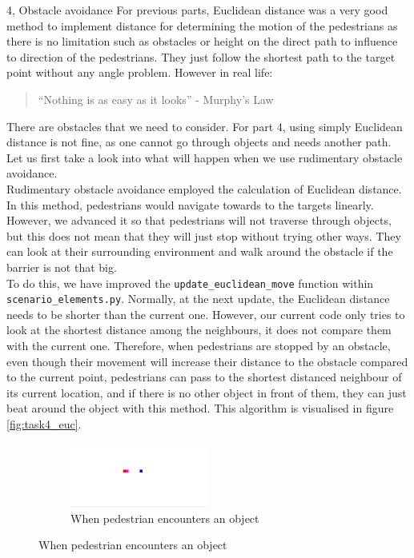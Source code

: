 \documentclass[10pt,a4paper]{article}
\begin{document}
\begin{task}{4, Obstacle avoidance}
For previous parts, Euclidean distance was a very good method to implement distance for determining the motion of the pedestrians as there is no limitation such as obstacles or height on the direct path to influence to direction of the pedestrians. They just follow the shortest path to the target point without any angle problem. However in real life: 


\begin{quote}
``Nothing is as easy as it looks'' - Murphy's Law
\end{quote}  

There are obstacles that we need to consider. For part 4, using simply Euclidean distance is not fine, as one cannot go through objects and needs another path. Let us first take a look into what will happen when we use rudimentary obstacle avoidance.\\

Rudimentary obstacle avoidance employed the calculation of Euclidean distance. In this method, pedestrians would navigate towards to the targets linearly. However, we advanced it so that pedestrians will not traverse through objects, but this does not mean that they will just stop without trying other ways. They can look at their surrounding environment and walk around the obstacle if the barrier is not that big.\\

To do this, we have improved the \texttt {update\_euclidean\_move} function within \texttt {scenario\_elements.py}. Normally, at the next update, the Euclidean distance needs to be shorter than the current one. However, our current code only tries to look at the shortest distance among the neighbours, it does not compare them with the current one. Therefore, when pedestrians are stopped by an obstacle, even though their movement will increase their distance to the obstacle compared to the current point, pedestrians can pass to the shortest distanced neighbour of its current location, and if there is no other object in front of them, they can just beat around the object with this method. This algorithm is visualised in figure \ref{fig:task4_euc}. \\



\begin{figure}[H]
\begin{subfigure}[t]{0.5\textwidth}
 \centering
 \includegraphics[width=0.5\textwidth]{images/task4_1object_touched.png}
 \caption{When pedestrian encounters an object}
 

\end{subfigure}
\end{figure}
\end{task}
\end{document}
